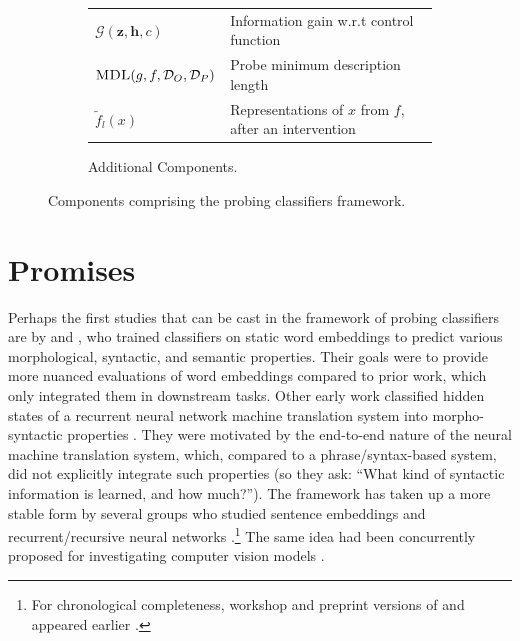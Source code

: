 \documentclass[discussion]{clv3}
\begin{document}
\begin{figure}[h]
\begin{subfigure}[b]{\textwidth}
\begin{tabular}{l @{\hskip 1em} l }
         $ \mathcal{G}(\mathbf{z}, \mathbf{h}, c) $ & Information gain w.r.t control function \cite{pimentel-etal-2020-information} \\ 
         $\textsc{MDL}(g, f, \mathcal{D}_O, \mathcal{D}_P)$ & Probe minimum description length \cite{voita-titov-2020-information} \\ 
         $\tilde{f}_l(x)$ & Representations of $x$ from $f$, after an intervention \\ 
         \bottomrule 
        \end{tabular}
        \caption{Additional Components.}
        \label{fig:probing-components-extended}
        \vspace{-3pt}
    \end{subfigure}
    \caption{Components comprising the probing classifiers framework.}
    \label{fig:probing-components}
    \vspace{-19pt}
\end{figure}



\section{Promises} \label{sec:promises}


Perhaps the first studies that can be cast in the framework of probing classifiers are by \citet{kohn-2015-whats} and \citet{gupta-etal-2015-distributional}, who trained classifiers on static word embeddings to predict various morphological, syntactic, and semantic properties. Their goals were to provide more nuanced evaluations of word embeddings compared to prior work, which only integrated them in downstream tasks.  
Other early work classified hidden states of a recurrent neural network machine translation system into morpho-syntactic properties \cite{shi-etal-2016-string}. They were motivated by the end-to-end nature of the neural machine translation system, which, compared to a phrase/syntax-based system, did not explicitly integrate such properties (so they ask: ``What kind of syntactic information is learned, and how much?'').  
The framework has taken up a more stable form by several groups who studied sentence embeddings \cite{ettinger-etal-2016-probing,adi:2017:ICLR,conneau-etal-2018-cram}  and recurrent/recursive neural networks \cite{belinkov-etal-2017-neural,hupkes2018visualisation}.\footnote{For chronological completeness, workshop and preprint versions of \citet{hupkes2018visualisation} and \citet{adi:2017:ICLR} appeared earlier \cite{veldhoen2016diagnostic,DBLP:journals/corr/AdiKBLG16}.}  The same idea had been concurrently proposed for investigating computer vision models \cite{alain2016understanding}. 
\end{document}
